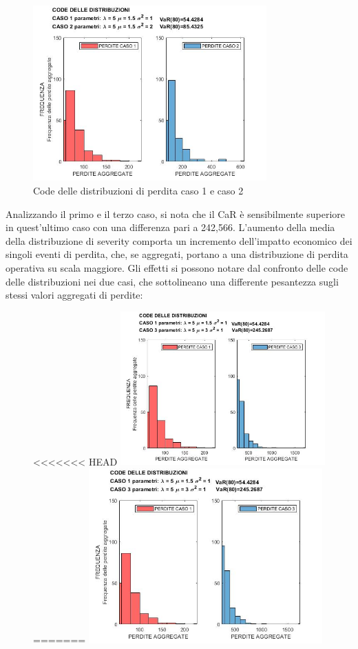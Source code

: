 \documentclass[titlepage]{article}
\begin{document}
\begin{itemize}
\begin{figure}[htbp]
	\centering
	\includegraphics[width=0.8\textwidth]{CODE 1VS2.jpg}
	\caption{\label{fig:CODE 1VS2.jpg}Code delle distribuzioni di perdita caso 1 e caso 2}
\end{figure}
	Analizzando il primo e il terzo caso, si nota che il CaR è sensibilmente superiore in quest’ultimo caso con una differenza pari a 242,566. L’aumento della media della distribuzione di severity comporta un incremento dell’impatto economico dei singoli eventi di perdita, che, se aggregati, portano a una distribuzione di perdita operativa su scala maggiore. Gli effetti si possono notare dal confronto delle code delle distribuzioni nei due casi, che sottolineano una differente pesantezza sugli stessi valori aggregati di perdite:
\begin{figure}[htbp]
	\centering
<<<<<<< HEAD
	\includegraphics[width=0.7\textwidth]{CODE1VS3.jpg}
=======
	\includegraphics[width=0.8\textwidth]{CODE1VS3.jpg}

\end{figure}
\end{itemize}
\end{document}
